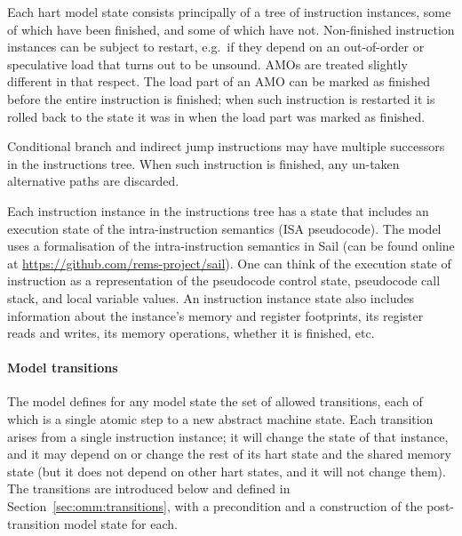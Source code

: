 Each hart model state consists principally of a tree of instruction instances, some of which have been finished, and some of which have not.
Non-finished instruction instances can be subject to restart, e.g.~if they depend on an out-of-order or speculative load that turns out to be unsound.
AMOs are treated slightly different in that respect.
The load part of an AMO can be marked as finished before the entire instruction is finished; when such instruction is restarted it is rolled back to the state it was in when the load part was marked as finished.

Conditional branch and indirect jump instructions may have multiple successors in the instructions tree.
When such instruction is finished, any un-taken alternative paths are discarded.

Each instruction instance in the instructions tree has a state that includes an execution state of the intra-instruction semantics (ISA pseudocode).
The model uses a formalisation of the intra-instruction semantics in Sail (can be found online at \url{https://github.com/rems-project/sail}).
One can think of the execution state of instruction as a representation of the pseudocode control state, pseudocode call stack, and local variable values.
An instruction instance state also includes information about the instance's memory and register footprints, its register reads and writes, its memory operations, whether it is finished, etc.

\paragraph{Model transitions}
The model defines for any model state the set of allowed transitions, each of which is a single atomic step to a new abstract machine state.
Each transition arises from a single instruction instance; it will change the state of that instance, and it may depend on or change the rest of its hart state and the shared memory state (but it does not depend on other hart states, and it will not change them).
The transitions are introduced below and defined in Section~\ref{sec:omm:transitions}, with a precondition and a construction of the post-transition model state for each.

